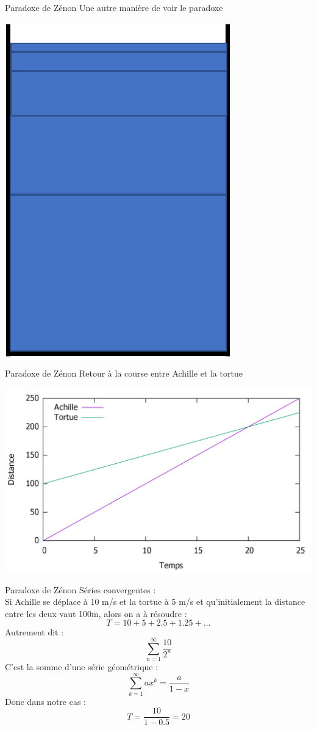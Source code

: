 \documentclass[11pt]{beamer}
\begin{document}
\begin{frame}{Paradoxe de Zénon}
Une autre manière de voir le paradoxe
\begin{center}
	\includegraphics[scale=0.5]{glass5.png}
\end{center}
\end{frame}
\begin{frame}{Paradoxe de Zénon}
Retour à la course entre Achille et la tortue 
\pause
\begin{center}
	\includegraphics[scale=0.35]{ZAPT2.png}
\end{center}
\end{frame}
\begin{frame}{Paradoxe de Zénon}
	Séries convergentes :
	\\ Si Achille se déplace à 10 m/s et la tortue à 5 m/s et qu'initialement la distance entre les deux vaut 100m, alors on a à résoudre : 
	\[ T = 10 + 5 + 2.5 + 1.25 + ...\] \pause
	Autrement dit :
	\[ \sum_{n=1}^{\infty} \frac{10}{2^n}\]
	C'est la somme d'une série géométrique : \[\sum_{k=1}^{\infty} ax^k = \frac{a}{1-x} \] \pause 
	Donc dans notre cas : \[ T = \frac{10}{1- 0.5} = 20 \]
\end{frame}
\end{document}
